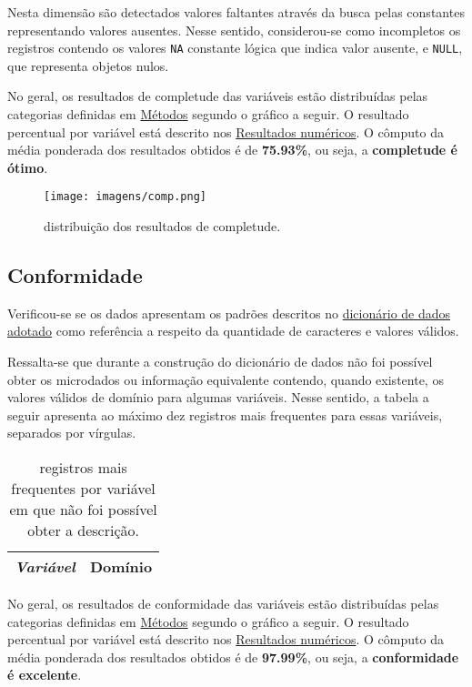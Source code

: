 \documentclass[
  12,
  table]{proadi}
\begin{document}
Nesta dimensão são detectados valores faltantes através da busca pelas
constantes representando valores ausentes. Nesse sentido, considerou-se
como incompletos os registros contendo os valores \texttt{NA} constante
lógica que indica valor ausente, e \texttt{NULL}, que representa objetos
nulos.

No geral, os resultados de completude das variáveis estão distribuídas
pelas categorias definidas em \protect\hyperlink{muxe9todos}{Métodos}
segundo o gráfico a seguir. O resultado percentual por variável está
descrito nos \protect\hyperlink{resultados-numuxe9ricos}{Resultados
numéricos}. O cômputo da média ponderada dos resultados obtidos é de
\textbf{75.93\%}, ou seja, a \textbf{completude é ótimo}.

\begin{figure}
\centering
\texttt{[image: imagens/comp.png]}
\caption{distribuição dos resultados de completude.}
\end{figure}

\hypertarget{conformidade}{%
\subsection{Conformidade}\label{conformidade}}

Verificou-se se os dados apresentam os padrões descritos no
\protect\hyperlink{dicionuxe1rio-adotado}{dicionário de dados adotado}
como referência a respeito da quantidade de caracteres e valores
válidos.

Ressalta-se que durante a construção do dicionário de dados não foi
possível obter os microdados ou informação equivalente contendo, quando
existente, os valores válidos de domínio para algumas variáveis. Nesse
sentido, a tabela a seguir apresenta ao máximo dez registros mais
frequentes para essas variáveis, separados por vírgulas.

\begingroup\fontsize{10}{12}\selectfont

\begin{longtable}[t]{>{}l>{\raggedright\arraybackslash}p{10cm}}
\caption{\label{tab:unnamed-chunk-12}registros mais frequentes por variável em que não foi possível obter a descrição.}\\
\toprule
\em{Variável} & Domínio\\


\bottomrule
\end{longtable}
\endgroup{}

No geral, os resultados de conformidade das variáveis estão distribuídas
pelas categorias definidas em \protect\hyperlink{muxe9todos}{Métodos}
segundo o gráfico a seguir. O resultado percentual por variável está
descrito nos \protect\hyperlink{resultados-numuxe9ricos}{Resultados
numéricos}. O cômputo da média ponderada dos resultados obtidos é de
\textbf{97.99\%}, ou seja, a \textbf{conformidade é excelente}.
\end{document}
